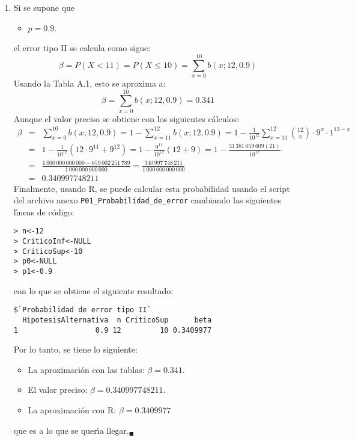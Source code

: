 \begin{solucion}
\begin{enumerate}
  \item Si se supone que
  \begin{itemize}
   \item $p = 0.9$.
  \end{itemize}
  el error tipo II se calcula como sigue:
  \begin{equation*}
   \beta = P(X < 11) = P(X \leq 10) = \sum_{x=0}^{10} b(x;12,0.9)
  \end{equation*}
  Usando la Tabla A.1, esto se aproxima a:
  \begin{equation*}
   \beta = \sum_{x=0}^{10} b(x;12,0.9) = 0.341
  \end{equation*}
  Aunque el valor preciso se obtiene con los siguientes c\'alculos:
  \begin{eqnarray*}
   \beta & = & \sum_{x=0}^{10} b(x;12,0.9) = 1 - \sum_{x=11}^{12} b(x;12,0.9) = 1 - \frac{1}{10^{12}} \sum_{x=11}^{12} \binom{12}{x} \cdot 9^x \cdot 1^{12-x} \\
   & = & 1 - \frac{1}{10^{12}}\left( 12\cdot 9^{11} + 9^{12} \right) = 1 -\frac{9^{11}}{10^{12}}(12 +9) = 1 - \frac{31\,381\,059\,609(21)}{10^{12}} \\
   & = & \frac{1\,000\,000\,000\,000 - 659\,002\,251\,789}{1\,000\,000\,000\,000} = \frac{340\,997\,748\,211}{1\,000\,000\,000\,000} \\
   & = & 0.340997748211
  \end{eqnarray*}
  Finalmente, usando R, se puede calcular esta probabilidad usando el script del archivo anexo \texttt{P01\_Probabilidad\_de\_error} cambiando las siguientes l\'{\i}neas de c\'odigo:
  \begin{verbatim}
> n<-12
> CriticoInf<-NULL
> CriticoSup<-10
> p0<-NULL
> p1<-0.9
  \end{verbatim}
  \vspace{-0.5cm}
  con lo que se obtiene el siguiente resultado:
  \begin{verbatim}
$`Probabilidad de error tipo II`
  HipotesisAlternativa  n CriticoSup      beta
1                  0.9 12         10 0.3409977
  \end{verbatim}
  \vspace{-0.5cm}
  Por lo tanto, se tiene lo siguiente:
  \begin{itemize}
   \item La aproximaci\'on con las tablas: $\beta = 0.341$.
   \item El valor preciso: $\beta = 0.340997748211$.
   \item La aproximaci\'on con R: $\beta = 0.3409977$
  \end{itemize}
  que es a lo que se quer\'{\i}a llegar.${}_{\blacksquare}$
 \end{enumerate}
\end{solucion}
